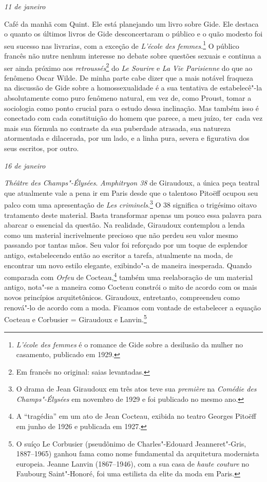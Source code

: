 \pagebreak

\begin{flushright}
\emph{11 de janeiro}
\end{flushright}

Café da manhã com Quint. Ele está planejando um
livro sobre Gide. Ele destaca o quanto os últimos livros de Gide
desconcertaram o público e o quão modesto foi seu sucesso nas livrarias,
com a exceção de \emph{L'école des femmes}.\footnote{\emph{L'école
  des femmes} é o romance de Gide sobre a desilusão da mulher no
  casamento, publicado em 1929. \versal{[N.~O.]}} O público francês não nutre nenhum
interesse no debate sobre questões sexuais e continua a ser ainda próximo aos
\emph{retroussés}\footnote{Em francês no original: saias levantadas. \versal{[N.~T.]}} do \emph{Le Sourire} e \emph{La Vie Parisienne} do
que ao fenômeno Oscar Wilde. De minha parte cabe dizer que a mais
notável fraqueza na discussão de Gide sobre a homossexualidade é a sua
tentativa de estabelecê"-la absolutamente como puro fenômeno natural, em
vez de, como Proust, tomar a sociologia como ponto crucial para o estudo
dessa inclinação. Mas também isso é conectado com cada constituição do
homem que parece, a meu juízo, ter~cada vez mais sua fórmula no
contraste da sua puberdade atrasada, sua natureza atormentada e
dilacerada, por um lado, e a linha pura, severa e figurativa dos seus
escritos, por outro.

\begin{flushright}
\emph{16 de janeiro}
\end{flushright}

\emph{Théâtre des Champs"-Élysées}. \emph{Amphitryon 38} de
Giraudoux, a única peça teatral que atualmente vale a pena ir em Paris
desde que o talentoso Pitoëff ocupou seu palco com uma apresentação de
\emph{Les criminels}.\footnote{O drama de Jean Giraudoux em três
  atos teve sua \emph{première} na \emph{Comédie des Champs"-Élysées} em
  novembro de 1929 e foi publicado no mesmo ano. \versal{[N.~O.]}} O 38 significa o
trigésimo oitavo tratamento deste material. Basta transformar apenas um
pouco essa palavra para abarcar o essencial da questão. Na realidade, Giraudoux
contemplou a lenda como um material incrivelmente precioso que não
perdeu seu valor mesmo passando por tantas mãos. Seu valor foi
reforçado por um toque de esplendor antigo, estabelecendo então ao
escritor a tarefa, atualmente na moda, de encontrar um novo estilo
elegante, exibindo"-a de maneira inesperada. Quando comparada com
\emph{Orfeu} de Cocteau,\footnote{A ``tragédia'' em um ato de
  Jean Cocteau, exibida no teatro Georges Pitoëff em junho de 1926 e
  publicada em 1927. \versal{[N.~O.]}} também uma reelaboração de um material antigo,
nota"-se a maneira como Cocteau constrói o mito de acordo com os mais
novos princípios arquitetônicos. Giraudoux, entretanto, compreendeu como
renová"-lo de acordo com a moda. Ficamos com vontade de estabelecer a
equação Cocteau e Corbusier = Giraudoux e Lanvin.\footnote{O suíço Le
  Corbusier (pseudônimo de Charles"-Edouard Jeanneret"-Gris, 1887--1965) ganhou
  fama como nome fundamental da arquitetura modernista europeia. Jeanne
  Lanvin (1867--1946), com a sua casa de \emph{haute couture} no Faubourg
  Saint"-Honoré, foi uma estilista da elite da moda em Paris. \versal{[N.~O.]}}

